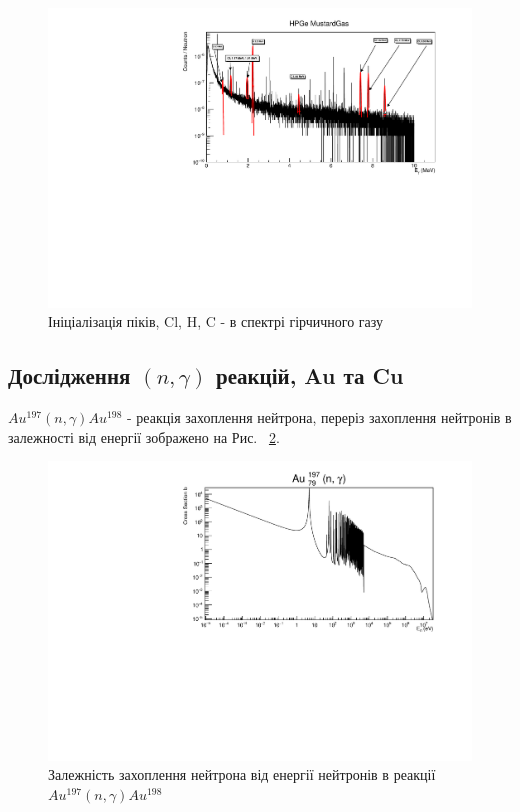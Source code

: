 \documentclass[a4paper, 14pt]{article}
\numberwithin{equation}{section}
\numberwithin{table}{section}
\begin{document}
	\begin{figure}[hbt!]
		\centering \includegraphics[width=1\textwidth]{res/mustard_gas.pdf}
		\caption{Ініціалізація піків, Cl, H, C - в спектрі гірчичного газу} 
		\label{ris:mustard}	
	\end{figure} 
	
	\subsection{Дослідження $(n, \gamma)$ реакцій, Au та Cu} 
	$Au^{197}(n,\gamma)Au^{198}$ - реакція захоплення нейтрона, переріз захоплення нейтронів в залежності від енергії зображено на Рис.~ \ref{ris:AuSigma}.
	\begin{figure}[hbt!]
		\centering \includegraphics[width=1\textwidth]{sigma/Au197Sigma.pdf}
		\caption{Залежність захоплення нейтрона від енергії нейтронів в реакції  $Au^{197}(n,\gamma)Au^{198}$} 
		\label{ris:AuSigma}	
	\end{figure} 
	
\end{document}
